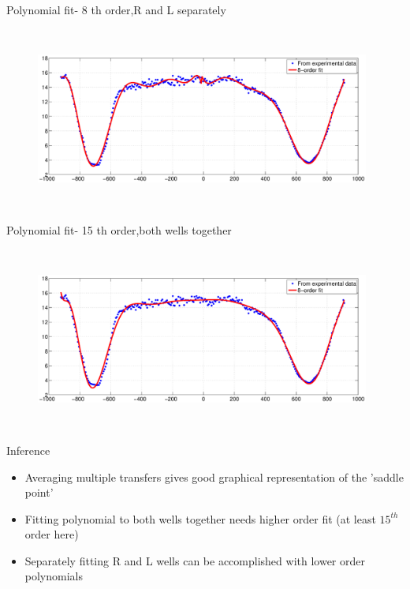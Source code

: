 \documentclass{beamer}
\begin{document}
\begin{frame}{Polynomial fit- 8 th order,R and L separately} 

\begin{figure}
    \centering
    \includegraphics[height=6cm,width=11cm]{separate_polyfit_probb1_8order.eps}
    \label{fig:graph29}
\end{figure}

\end{frame}

\begin{frame}{Polynomial fit- 15 th order,both wells together} 

\begin{figure}
    \centering
    \includegraphics[height=6cm,width=11cm]{total_polyfit_probb1_15order.eps}
    \label{fig:graph30}
\end{figure}

\end{frame}

\begin{frame}{Inference} 

\begin{itemize}

\item Averaging multiple transfers gives good graphical representation of the 'saddle point'
\item Fitting polynomial to both wells together needs higher order fit (at least $15^{th}$ order here)
\item Separately fitting R and L wells can be accomplished with lower order polynomials

\end{itemize}

\end{frame}
\end{document}
